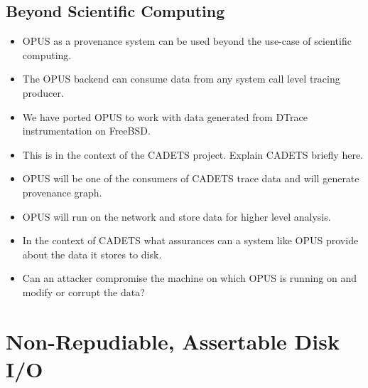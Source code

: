 \documentclass[withindex,glossary]{cam-thesis}
\begin{document}
\section{Beyond Scientific Computing}
\begin{itemize}
\item OPUS as a provenance system can be used beyond the use-case of scientific computing.
\item The OPUS backend can consume data from any system call level tracing producer.
\item We have ported OPUS to work with data generated from DTrace instrumentation on FreeBSD.
\item This is in the context of the CADETS project. Explain CADETS briefly here.
\item OPUS will be one of the consumers of CADETS trace data and will generate provenance graph.
\item OPUS will run on the network and store data for higher level analysis.
\item In the context of CADETS what assurances can a system like OPUS provide about the data it stores to disk.
\item Can an attacker compromise the machine on which OPUS is running on and modify or corrupt the data?
\end{itemize}


\chapter{Non-Repudiable, Assertable Disk I/O} %
\end{document}
